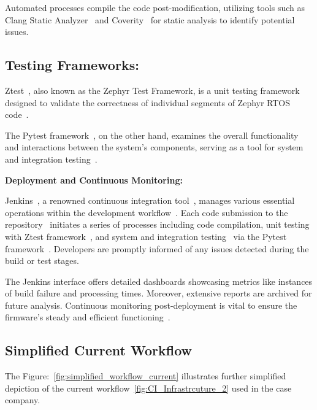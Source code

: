 Automated processes compile the code post-modification, utilizing tools such as
Clang Static Analyzer~\cite{kremenek2008finding} and
Coverity~\cite{imtiaz2019developers} for static analysis to identify potential
issues.

\subsection*{Testing Frameworks:}

Ztest~\cite{TestFram11:online}, also known as the Zephyr Test Framework,
is a unit testing framework~\cite{runeson2006survey}
designed to validate the correctness of individual segments of Zephyr RTOS
code~\cite{TestFram11:online}.

The Pytest framework~\cite{hunt2019pytest}, on the other hand, examines the
overall functionality and interactions between the system's components, serving
as a tool for system and integration testing~\cite{TheFourL21:online}.

\textbf{Deployment and Continuous Monitoring:}

Jenkins~\cite{jenkins1963jenkins}, a renowned continuous integration tool~\cite{smart2011jenkins}, manages
various essential operations within the development
workflow~\cite{sayfan2017mastering}. Each code submission to the repository~\cite{milanesio2013learning}
initiates a series of processes including code compilation, unit testing~\cite{runeson2006survey} with
Ztest framework~\cite{TestFram11:online}, and system and integration
testing~\cite{TheFourL21:online} via the Pytest framework~\cite{hunt2019pytest}.
Developers are promptly informed of any issues detected during the build or test
stages.

The Jenkins interface offers detailed dashboards showcasing metrics like
instances of build failure and processing times. Moreover, extensive reports are
archived for future analysis. Continuous monitoring post-deployment is vital to
ensure the firmware's steady and efficient functioning~\cite{mcallister2015mastering}.
\pagebreak

\subsection{Simplified Current Workflow}

The Figure:~\ref{fig:simplified_workflow_current} illustrates further simplified depiction of the
current workflow~\ref{fig:CI_Infrastrcuture_2} used in the case company.


